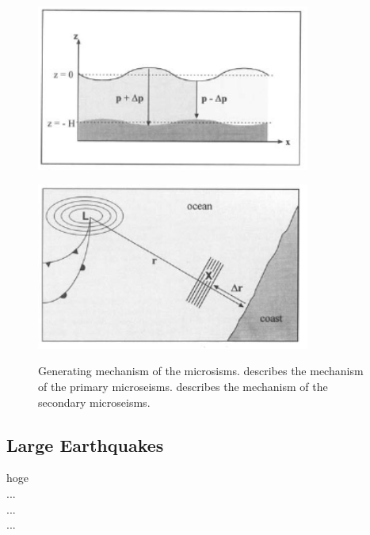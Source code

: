 \begin{figure}[h]
  \begin{center}
    \begin{minipage}[b]{0.65\hsize}
      \centering
      \includegraphics[width=9.0cm]{./img_chap3/img311.png}
      \label{img:img311}
    \end{minipage}
    \begin{minipage}[b]{0.65\hsize}
      \centering      
      \includegraphics[width=9.0cm]{./img_chap3/img312.png}
      \label{img:img312}
    \end{minipage}
  \end{center}
  \caption{ Generating mechanism of the microsisms.  describes the mechanism of the primary microseisms.  describes the mechanism of the secondary microseisms.}
\end{figure}


\subsection{Large Earthquakes} \label{sec:313}
hoge\\
...\\
...\\
...\\

